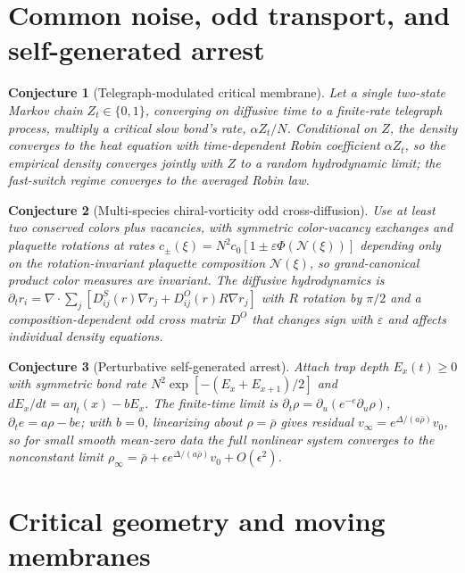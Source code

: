 \documentclass[11pt]{article}
\newtheorem{conjecture}{Conjecture}
\theoremstyle{definition}
\begin{document}
\section{Common noise, odd transport, and self-generated arrest}

\begin{conjecture}[Telegraph-modulated critical membrane]\label{an10}
Let a single two-state Markov chain $Z_t\in\{0,1\}$, converging on diffusive time to a finite-rate telegraph process, multiply a critical slow bond's rate, $\alpha Z_t/N$.  Conditional on $Z$, the density converges to the heat equation with time-dependent Robin coefficient $\alpha Z_t$, so the empirical density converges jointly with $Z$ to a random hydrodynamic limit; the fast-switch regime converges to the averaged Robin law.
\end{conjecture}

\begin{conjecture}[Multi-species chiral-vorticity odd cross-diffusion]\label{an11}
Use at least two conserved colors plus vacancies, with symmetric color-vacancy exchanges and plaquette rotations at rates $c_\pm(\xi)=N^2c_0[1\pm\varepsilon\Phi(\mathcal N(\xi))]$ depending only on the rotation-invariant plaquette composition $\mathcal N(\xi)$, so grand-canonical product color measures are invariant.  The diffusive hydrodynamics is $\partial_tr_i=\nabla\cdot\sum_j[D^S_{ij}(r)\nabla r_j+D^O_{ij}(r)R\nabla r_j]$ with $R$ rotation by $\pi/2$ and a composition-dependent odd cross matrix $D^O$ that changes sign with $\varepsilon$ and affects individual density equations.
\end{conjecture}

\begin{conjecture}[Perturbative self-generated arrest]\label{an12}
Attach trap depth $E_x(t)\ge0$ with symmetric bond rate $N^2\exp[-(E_x+E_{x+1})/2]$ and $dE_x/dt=a\eta_t(x)-bE_x$.  The finite-time limit is $\partial_t\rho=\partial_u(e^{-e}\partial_u\rho)$, $\partial_te=a\rho-be$; with $b=0$, linearizing about $\rho=\bar\rho$ gives residual $v_\infty=e^{\Delta/(a\bar\rho)}v_0$, so for small smooth mean-zero data the full nonlinear system converges to the nonconstant limit $\rho_\infty=\bar\rho+\epsilon e^{\Delta/(a\bar\rho)}v_0+O(\epsilon^2)$.
\end{conjecture}

\section{Critical geometry and moving membranes}
\end{document}
